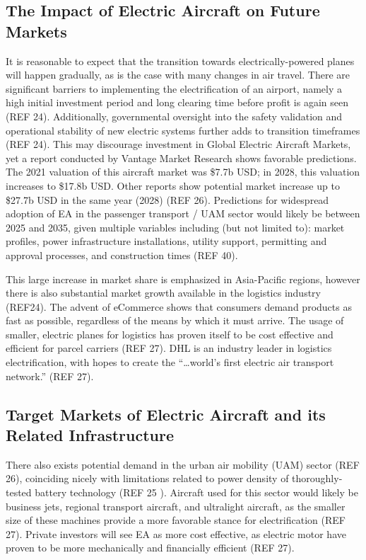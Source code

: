 \documentclass{article}
\begin{document}
\subsection{The Impact of Electric Aircraft on Future Markets}
It is reasonable to expect that the transition towards electrically-powered planes will happen gradually, as is the case with many changes in air travel. 
There are significant barriers to implementing the electrification of an airport, namely a high initial investment period and long clearing time before profit is again seen (REF 24).  
Additionally, governmental oversight into the safety validation and operational stability of new electric systems further adds to transition timeframes (REF 24). 
This may discourage investment in Global Electric Aircraft Markets, yet a report conducted by Vantage Market Research shows favorable predictions. 
The 2021 valuation of this aircraft market was \$7.7b USD; in 2028, this valuation increases to \$17.8b USD. 
Other reports show potential market increase up to \$27.7b USD in the same year (2028) (REF 26). 
Predictions for widespread adoption of EA in the passenger transport / UAM sector would likely be between 2025 and 2035, given multiple variables including (but not limited to): market profiles, power infrastructure installations, utility support, permitting and approval processes, and construction times (REF 40).\par


This large increase in market share is emphasized in Asia-Pacific regions, however there is also substantial market growth available in the logistics industry (REF24). 
The advent of eCommerce shows that consumers demand products as fast as possible, regardless of the means by which it must arrive. 
The usage of smaller, electric planes for logistics has proven itself to be cost effective and efficient for parcel carriers (REF 27). 
DHL is an industry leader in logistics electrification, with hopes to create the “…world’s first electric air transport network.” (REF 27).\par


\subsection{Target Markets of Electric Aircraft and its Related Infrastructure}
There also exists potential demand in the urban air mobility (UAM) sector (REF 26), coinciding nicely with limitations related to power density of thoroughly-tested battery technology (REF 25 ). 
Aircraft used for this sector would likely be business jets, regional transport aircraft, and ultralight aircraft, as the smaller size of these machines provide a more favorable stance for electrification (REF 27). 
Private investors will see EA as more cost effective, as electric motor have proven to be more mechanically and financially efficient (REF 27).\par
\end{document}
